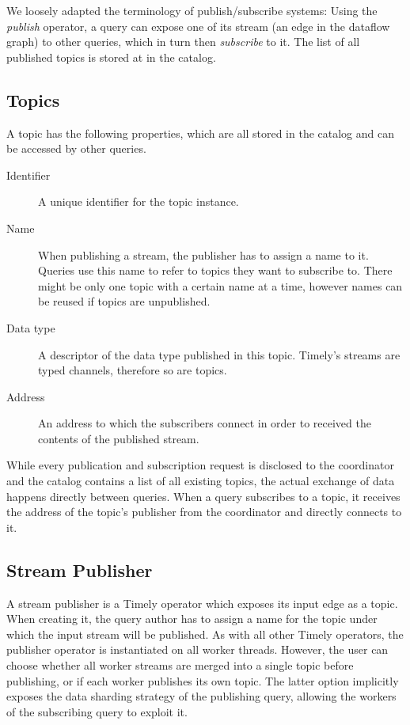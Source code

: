 We loosely adapted the terminology of publish/subscribe systems: Using the
\emph{publish} operator, a query can expose one of its stream
(an edge in the dataflow graph) to other queries, which in turn then \emph{subscribe}
to it. The list of all published topics is stored at in the catalog.

\subsection{Topics}

A topic has the following properties, which are all stored in the catalog
and can be accessed by other queries.
\begin{description}
\item [Identifier] A unique identifier for the topic instance.
\item [Name] When publishing a stream, the publisher has to assign a name to it.
Queries use this name to refer to topics they want to subscribe to. There might
be only one topic with a certain name at a time, however names can be reused if
topics are unpublished.
\item [Data type] A descriptor of the data type published in this topic. Timely's
streams are typed channels, therefore so are topics.
\item [Address] An address to which the subscribers connect in order to received
the contents of the published stream.
\end{description}

While every publication and subscription request is disclosed to the coordinator
and the catalog contains a list of all existing topics, the
actual exchange of data happens directly between queries. When a query subscribes
to a topic, it receives the address of the topic's publisher from the coordinator
and directly connects to it.

\subsection{Stream Publisher}

A stream publisher is a Timely operator which exposes its input edge as a topic. When
creating it, the query author has to assign a name for the topic under which the
input stream will be published. As with all other Timely operators, the publisher
operator is instantiated on all worker threads. However, the user can choose
whether all worker streams are merged into a single topic before publishing, or
if each worker publishes its own topic. The latter option implicitly exposes
the data sharding strategy of the publishing query, allowing the workers of
the subscribing query to exploit it.

